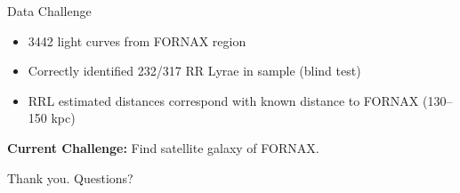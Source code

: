 \documentclass[12pt]{beamer}
\begin{document}
\begin{frame}{Data Challenge}
  \begin{itemize}
  \item 3442 light curves from FORNAX region
  \item Correctly identified 232/317 RR Lyrae in sample (blind test)
  \item RRL estimated distances correspond with known distance to FORNAX (130--150 kpc)
  \end{itemize}

  
\begin{minipage}{6in}
\end{minipage}

\begin{center}  
  \textbf{Current Challenge:} Find satellite galaxy of FORNAX.
\end{center}

\end{frame}

\begin{frame}[plain]

  \begin{center}
    {\huge Thank you. Questions?}
    \end{center}

\end{frame}


\end{document}
